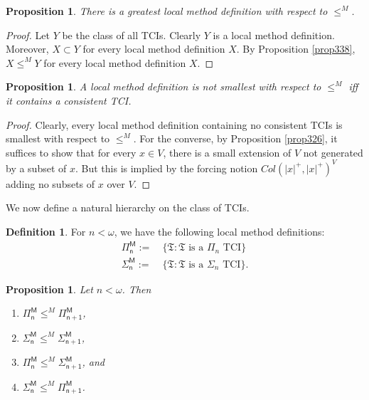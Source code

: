 \documentclass[12pt, twoside]{memoir}
\numberwithin{equation}{section}
\newtheorem{prop}[thm]{Proposition}
\theoremstyle{definition}
\newtheorem{defi}[thm]{Definition}
\theoremstyle{remark}
\theoremstyle{definition}
\theoremstyle{definition}
\theoremstyle{definition}
\theoremstyle{remark}
\begin{document}
\begin{prop}
There is a greatest local method definition with respect to $\leq^M$.
\end{prop}

\begin{proof}
Let $Y$ be the class of all TCIs. Clearly $Y$ is a local method definition. Moreover, $X \subset Y$ for every local method definition $X$. By Proposition \ref{prop338}, $X \leq^M Y$ for every local method definition $X$.
\end{proof}

\begin{prop}
A local method definition is not smallest with respect to $\leq^M$ iff it contains a consistent TCI.
\end{prop}

\begin{proof}
Clearly, every local method definition containing no consistent TCIs is smallest with respect to $\leq^M$. For the converse, by Proposition \ref{prop326}, it suffices to show that for every $x \in V$, there is a small extension of $V$ not generated by a subset of $x$. But this is implied by the forcing notion $Col(|x|^+, |x|^+)^V$ adding no subsets of $x$ over $V$.
\end{proof}

We now define a natural hierarchy on the class of TCIs.

\begin{defi}\label{def339}
For $n < \omega$, we have the following local method definitions:
\begin{align*}
    \mathsf{\Pi^M_n} := \ & \{\mathfrak{T} : \mathfrak{T} \text{ is a } \Pi_n \text{ TCI}\}
    \\
    \mathsf{\Sigma^M_n} := \ & \{\mathfrak{T} : \mathfrak{T} \text{ is a } \Sigma_n \text{ TCI}\} \text{.}
\end{align*}
\end{defi}

\begin{prop}\label{prop340}
Let $n < \omega$. Then
\begin{enumerate}[label=(\arabic*)]
    \item $\mathsf{\Pi^M_n} \leq^M \mathsf{\Pi^M_{n+1}}$,
    \item $\mathsf{\Sigma^M_n} \leq^M \mathsf{\Sigma^M_{n+1}}$,
    \item $\mathsf{\Pi^M_n} \leq^M \mathsf{\Sigma^M_{n+1}}$, and
    \item $\mathsf{\Sigma^M_n} \leq^M \mathsf{\Pi^M_{n+1}}$.
\end{enumerate}
\end{prop}
\end{document}
